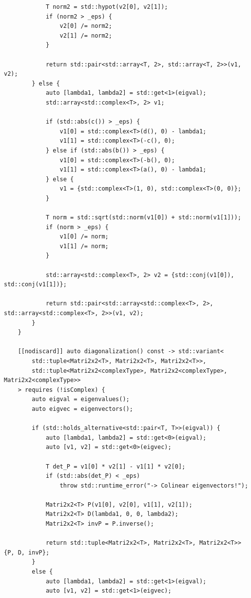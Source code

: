 \documentclass[11pt]{article}
\begin{document}
\begin{lstlisting}
            T norm2 = std::hypot(v2[0], v2[1]);
            if (norm2 > _eps) {
                v2[0] /= norm2;
                v2[1] /= norm2;
            }
            
            return std::pair<std::array<T, 2>, std::array<T, 2>>(v1, v2);
        } else {
            auto [lambda1, lambda2] = std::get<1>(eigval);
            std::array<std::complex<T>, 2> v1;
            
            if (std::abs(c()) > _eps) {
                v1[0] = std::complex<T>(d(), 0) - lambda1;
                v1[1] = std::complex<T>(-c(), 0);
            } else if (std::abs(b()) > _eps) {
                v1[0] = std::complex<T>(-b(), 0);
                v1[1] = std::complex<T>(a(), 0) - lambda1;
            } else {
                v1 = {std::complex<T>(1, 0), std::complex<T>(0, 0)};
            }
            
            T norm = std::sqrt(std::norm(v1[0]) + std::norm(v1[1]));
            if (norm > _eps) {
                v1[0] /= norm;
                v1[1] /= norm;
            }
            
            std::array<std::complex<T>, 2> v2 = {std::conj(v1[0]), std::conj(v1[1])};
            
            return std::pair<std::array<std::complex<T>, 2>, std::array<std::complex<T>, 2>>(v1, v2);
        }
    }

    [[nodiscard]] auto diagonalization() const -> std::variant<
        std::tuple<Matri2x2<T>, Matri2x2<T>, Matri2x2<T>>,
        std::tuple<Matri2x2<complexType>, Matri2x2<complexType>, Matri2x2<complexType>>
    > requires (!isComplex) {
        auto eigval = eigenvalues();
        auto eigvec = eigenvectors();
        
        if (std::holds_alternative<std::pair<T, T>>(eigval)) {
            auto [lambda1, lambda2] = std::get<0>(eigval);
            auto [v1, v2] = std::get<0>(eigvec);
            
            T det_P = v1[0] * v2[1] - v1[1] * v2[0];
            if (std::abs(det_P) < _eps)
                throw std::runtime_error("-> Colinear eigenvectors!");
            
            Matri2x2<T> P(v1[0], v2[0], v1[1], v2[1]);
            Matri2x2<T> D(lambda1, 0, 0, lambda2);
            Matri2x2<T> invP = P.inverse();
            
            return std::tuple<Matri2x2<T>, Matri2x2<T>, Matri2x2<T>>{P, D, invP};
        } 
        else {
            auto [lambda1, lambda2] = std::get<1>(eigval);
            auto [v1, v2] = std::get<1>(eigvec);
            

\end{lstlisting}
\end{document}
